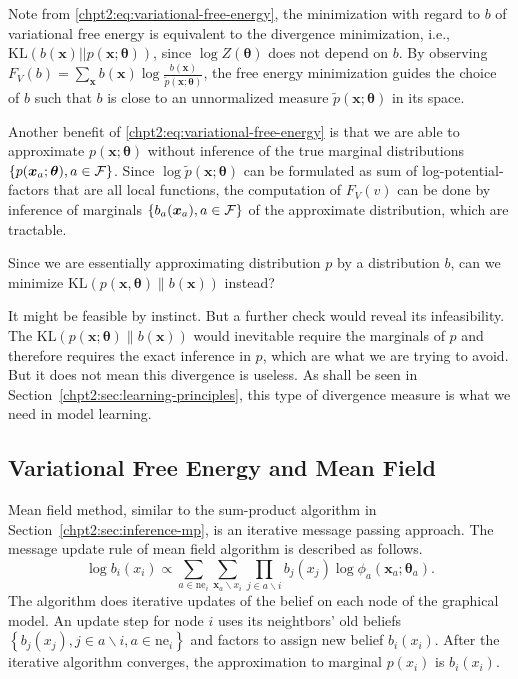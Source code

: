 \begin{remark}
  Note from \eqref{chpt2:eq:variational-free-energy}, the minimization with regard to $b$ of variational free energy is equivalent to the divergence minimization, i.e., $\mathrm{KL}(b( \bm{x}) || p(\bm{x}; \bm{\theta}))$, since $\log{Z(\bm{\theta})}$ does not depend on $b$. By observing $F_V(b) = \sum_{\bm{x}}b(\bm{x}) \log{\frac{b(\bm{x})}{\tilde{p}(\bm{x}; \bm{\theta})}}$, the free energy minimization guides the choice of $b$ such that $b$ is close to an unnormalized measure $\tilde{p}(\bm{x}; \bm{\theta})$ in its space.

  Another benefit of \eqref{chpt2:eq:variational-free-energy} is that we are able to approximate $p(\bm{x}; \bm{\theta})$ without inference of the true marginal distributions $\{p(\bm{x}_{a};\bm{\theta}), a \in \mathcal{F}\}$. Since $\log\tilde{p}(\bm{x}; \bm{\theta})$ can be formulated as sum of log-potential-factors that are all local functions, the computation of $F_V(v)$ can be done by inference of marginals $\left\{ b_{a}(\bm{x}_{a}), a \in \mathcal{F} \right\}$ of the approximate distribution, which are tractable.
\end{remark}

\begin{remark}[Discussion]
  Since we are essentially approximating distribution $p$ by a distribution $b$, can we minimize $\mathrm{KL}(p(\bm{x}, \bm{\theta})\|b(\bm{x}))$ instead?

  It might be feasible by instinct. But a further check would reveal its infeasibility. The $\mathrm{KL}(p(\bm{x}; \bm{\theta})\|b(\bm{x}))$ would inevitable require the marginals of $p$ and therefore requires the exact inference in $p$, which are what we are trying to avoid. But it does not mean this divergence is useless. As shall be seen in Section~\ref{chpt2:sec:learning-principles}, this type of divergence measure is what we need in model learning.
\end{remark}



\subsection{Variational Free Energy and Mean Field}

\sloppy Mean field method, similar to the sum-product algorithm in Section~\ref{chpt2:sec:inference-mp}, is an iterative message passing approach. 
The message update rule of mean field algorithm is described as follows.
\begin{equation}\label{chpt2:eq:mf-update}
  \log{b_i(x_i)} \propto \sum_{a \in \mathrm{ne}_i} \sum_{\bm{x}_{a} \backslash x_i} \prod_{j\in {a}\backslash i} b_j(x_j)\log{\phi_{a}}(\bm{x}_{a};\bm{\theta}_{a}).
\end{equation}
The algorithm does iterative updates of the belief on each node of the graphical model. An update step for node $i$ uses its neightbors' old  beliefs  $\left\{ b_j(x_j), j\in {a}\backslash i, a \in \mathrm{ne}_i \right\}$ and factors to assign new belief $b_i(x_i)$. After the iterative algorithm converges, the approximation to marginal $p(x_i)$ is $b_i(x_i)$.


